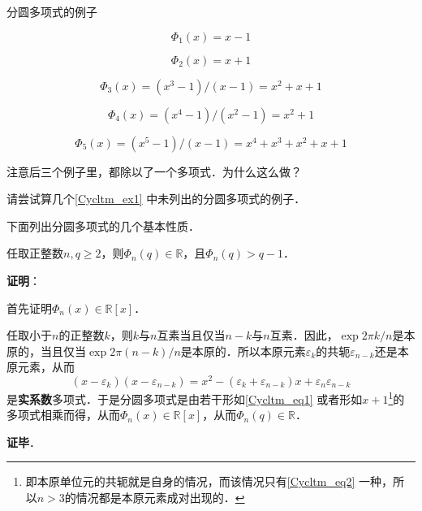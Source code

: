 \begin{example}{分圆多项式的例子}\label{Cycltm_ex1}

\begin{equation}
\Phi_1(x) = x-1
\end{equation}

\begin{equation}\label{Cycltm_eq2}
\Phi_2(x) = x+1
\end{equation}

\begin{equation}
\Phi_3(x) = (x^3-1)/(x-1) = x^2+x+1
\end{equation}

\begin{equation}
\Phi_4(x) = (x^4-1)/(x^2-1) = x^2+1
\end{equation}

\begin{equation}
\Phi_5(x) = (x^5-1)/(x-1) = x^4+x^3+x^2+x+1
\end{equation}

注意后三个例子里，都除以了一个多项式．为什么这么做？

\end{example}

\begin{exercise}{}
请尝试算几个\autoref{Cycltm_ex1} 中未列出的分圆多项式的例子．
\end{exercise}

下面列出分圆多项式的几个基本性质．

\begin{theorem}{}
任取正整数$n, q\geq 2$，则$\Phi_n(q)\in\mathbb{R}$，且$\Phi_n(q)>q-1$．
\end{theorem}

\textbf{证明}：

首先证明$\Phi_n(x)\in\mathbb{R}[x]$．

任取小于$n$的正整数$k$，则$k$与$n$互素当且仅当$n-k$与$n$互素．因此，$\exp{2\pi k/n}$是本原的，当且仅当$\exp{2\pi (n-k)/n}$是本原的．所以本原元素$\varepsilon_k$的共轭$\varepsilon_{n-k}$还是本原元素，从而
\begin{equation}\label{Cycltm_eq1}
(x-\varepsilon_k)(x-\varepsilon_{n-k})=x^2-(\varepsilon_k+\varepsilon_{n-k})x+\varepsilon_n\varepsilon_{n-k}
\end{equation}
是\textbf{实系数}多项式．于是分圆多项式是由若干形如\autoref{Cycltm_eq1} 或者形如$x+1$\footnote{即本原单位元的共轭就是自身的情况，而该情况只有\autoref{Cycltm_eq2} 一种，所以$n>3$的情况都是本原元素成对出现的．}的多项式相乘而得，从而$\Phi_n(x)\in\mathbb{R}[x]$，从而$\Phi_n(q)\in\mathbb{R}$．


\textbf{证毕}．













